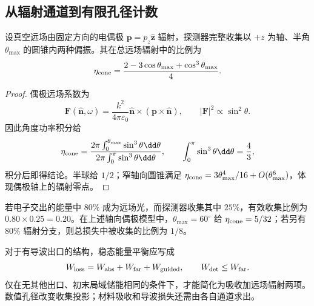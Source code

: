 \subsection{从辐射通道到有限孔径计数}
\label{chap:feqo-cl}

\begin{proposition}[偶极轴向圆锥的收集比例]
设真空远场由固定方向的电偶极 $\mathbf p=p_z\hat{\mathbf z}$ 辐射，探测器完整收集以 $+z$ 为轴、半角 $\theta_{\max}$ 的圆锥内两种偏振。其在总远场辐射中的比例为
\begin{equation}
\eta_{\rm cone}
=\frac{2-3\cos\theta_{\max}+\cos^3\theta_{\max}}4.
\label{eq:feqo-dipole-collection-fraction}
\end{equation}
\end{proposition}
\begin{proof}
偶极远场系数为
\[
\mathbf F(\hat{\mathbf n},\omega)
=\frac{k^2}{4\pi\varepsilon_0}
\hat{\mathbf n}\times(\mathbf p\times\hat{\mathbf n}),
\qquad |\mathbf F|^2\propto\sin^2\theta.
\]
因此角度功率积分给
\[
\eta_{\rm cone}
=\frac{2\pi\int_0^{\theta_{\max}}\sin^3\theta\dd\theta}
{2\pi\int_0^\pi\sin^3\theta\dd\theta},
\qquad\int_0^\pi\sin^3\theta\dd\theta=\frac43,
\]
积分后即得结论。半球给 $1/2$；窄轴向圆锥满足 $\eta_{\rm cone}=3\theta_{\max}^4/16+O(\theta_{\max}^6)$，体现偶极轴上的辐射零点。
\end{proof}

\begin{workedexample}[辐射分支与孔径效率]
若电子交出的能量中 $80\%$ 成为远场光，而探测器收集其中 $25\%$，有效收集比例为 $0.80\times0.25=0.20$。在上述轴向偶极模型中，$\theta_{\max}=60^\circ$ 给 $\eta_{\rm cone}=5/32$；若另有 $80\%$ 辐射分支，则总损失中被收集的比例为 $1/8$。

对于有导波出口的结构，稳态能量平衡应写成
\[
W_{\rm loss}=W_{\rm abs}+W_{\rm far}+W_{\rm guided},
\qquad W_{\rm det}\le W_{\rm far}.
\]
仅在无其他出口、初末局域储能相同的条件下，才能简化为吸收加远场辐射两项。数值孔径改变收集投影；材料吸收和导波损失还需由各自通道求出。
\end{workedexample}
